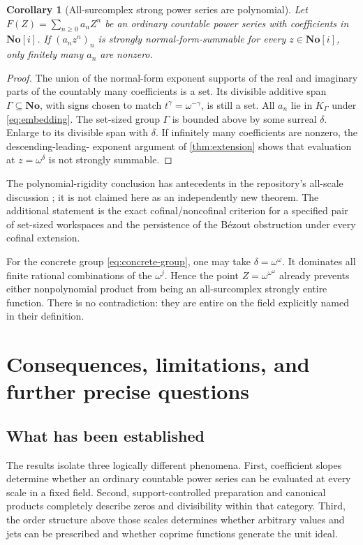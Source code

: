 \documentclass[11pt]{article}
\theoremstyle{plain}
\theoremstyle{plain}
\theoremstyle{plain}
\newtheorem{corollary}[corollary]{Corollary}
\theoremstyle{definition}
\theoremstyle{definition}
\theoremstyle{definition}
\theoremstyle{remark}
\newcommand{\No}{\mathbf{No}}
\begin{document}
\begin{corollary}[All-surcomplex strong power series are polynomial]
\label{cor:all-no}
Let $F(Z)=\sum_{n\ge0}a_nZ^n$ be an ordinary countable power series
with coefficients in $\No[i]$. If $(a_nz^n)_n$ is strongly
normal-form-summable for every $z\in\No[i]$, only finitely many
$a_n$ are nonzero.
\end{corollary}
\begin{proof}
The union of the normal-form exponent supports of the real and
imaginary parts of the countably many coefficients is a set.
Its divisible additive span $\Gamma\subseteq\No$, with signs
chosen to match $t^\gamma=\omega^{-\gamma}$, is still a set.
All $a_n$ lie in $K_\Gamma$ under \eqref{eq:embedding}.
The set-sized group $\Gamma$ is bounded above by some surreal
$\delta$. Enlarge to its divisible span with $\delta$.
If infinitely many coefficients are nonzero, the descending-leading-
exponent argument of \cref{thm:extension} shows that evaluation at
$z=\omega^\delta$ is not strongly summable.
\end{proof}

The polynomial-rigidity conclusion has antecedents in the repository's
all-scale discussion \cite{RepoCatalogue,RepoRankOne}; it is not
claimed here as an independently new theorem. The additional statement
is the exact cofinal/noncofinal criterion for a specified pair of
set-sized workspaces and the persistence of the B\'ezout obstruction
under every cofinal extension.

For the concrete group \eqref{eq:concrete-group}, one may take
$\delta=\omega^\omega$. It dominates all finite rational combinations
of the $\omega^j$. Hence the point
$Z=\omega^{\omega^\omega}$ already prevents either nonpolynomial
product from being an all-surcomplex strongly entire function.
There is no contradiction: they are entire on the field explicitly
named in their definition.

\section{Consequences, limitations, and further precise questions}
\label{sec:outlook}

\subsection{What has been established}
The results isolate three logically different phenomena.
First, coefficient slopes determine whether an ordinary countable
power series can be evaluated at every scale in a fixed field.
Second, support-controlled preparation and canonical products
completely describe zeros and divisibility within that category.
Third, the order structure above those scales determines whether
arbitrary values and jets can be prescribed and whether coprime
functions generate the unit ideal.
\end{document}
